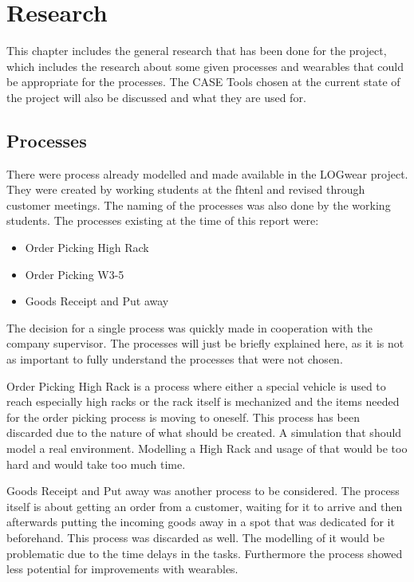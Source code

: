 \chapter{Research}\label{cha:research}
This chapter includes the general research that has been done for the project, which includes the research about some given processes and wearables that could be appropriate for the processes. The CASE Tools chosen at the current state of the project will also be discussed and what they are used for.

\section{Processes}\label{sec:processes}
There were process already modelled and made available in the LOGwear project. They were created by working students at the \gls{fhtenl} and revised through customer meetings. The naming of the processes was also done by the working students. The processes existing at the time of this report were:

\begin{itemize}
	\item Order Picking High Rack
	\item Order Picking W3-5
	\item Goods Receipt and Put away
\end{itemize}

The decision for a single process was quickly made in cooperation with the company supervisor. The processes will just be briefly explained here, as it is not as important to fully understand the processes that were not chosen.

Order Picking High Rack is a process where either a special vehicle is used to reach especially high racks or the rack itself is mechanized and the items needed for the order picking process is moving to oneself. This process has been discarded due to the nature of what should be created. A simulation that should model a real environment. Modelling a High Rack and usage of that would be too hard and would take too much time.

Goods Receipt and Put away was another process to be considered. The process itself is about getting an order from a customer, waiting for it to arrive and then afterwards putting the incoming goods away in a spot that was dedicated for it beforehand. This process was discarded as well. The modelling of it would be problematic due to the time delays in the tasks. Furthermore the process showed less potential for improvements with wearables.

